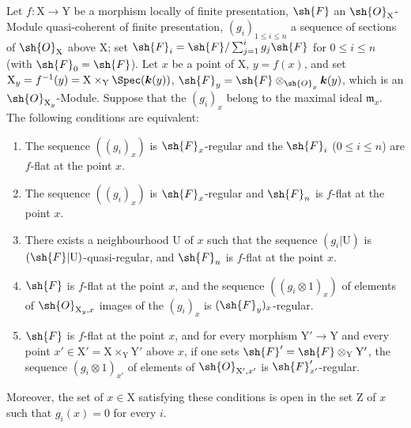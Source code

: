 \begin{theorem}[11.3.8]
\label{IV.11.3.8}
Let $f:\mathrm{X}\to\mathrm{Y}$ be a morphism locally of finite presentation, $\sh{F}$ an $\sh{O}_\mathrm{X}$-Module quasi-coherent of finite presentation, $(g_i)_{1\leqslant i\leqslant n}$ a sequence of sections of $\sh{O}_\mathrm{X}$ above $\mathrm{X}$; set $\sh{F}_i=\sh{F}/\sum_{j=1}^{i}g_j\sh{F}$ for $0\leqslant i\leqslant n$ (with $\sh{F}_0=\sh{F}$). Let $x$ be a point of $\mathrm{X}$, $y=f(x)$, and set $\mathrm{X}_y=f^{-1}(y)=\mathrm{X}\times_\mathrm{Y}\Spec(\boldsymbol{k}(y))$, $\sh{F}_y=\sh{F}\otimes_{\sh{O}_y}\boldsymbol{k}(y)$, which is an $\sh{O}_{\mathrm{X}_y}$-Module. Suppose that the $(g_i)_x$ belong to the maximal ideal $\mathfrak{m}_x$. The following conditions are equivalent:
\begin{enumerate}[label=\emph{\alph*)}]
  \item The sequence $((g_i)_x)$ is $\sh{F}_x$-regular and the $\sh{F}_i$ ($0\leqslant i\leqslant n$) are $f$-flat at the point $x$.
  \item The sequence $((g_i)_x)$ is $\sh{F}_x$-regular and $\sh{F}_n$ is $f$-flat at the point $x$.
  \item[\emph{b$'$)}] There exists a neighbourhood $\mathrm{U}$ of $x$ such that the sequence $(g_i|\mathrm{U})$ is $(\sh{F}|\mathrm{U})$-quasi-regular, and $\sh{F}_n$ is $f$-flat at the point $x$.
  \item $\sh{F}$ is $f$-flat at the point $x$, and the sequence $((g_i\otimes 1)_x)$ of elements of $\sh{O}_{\mathrm{X}_y,x}$ images of the $(g_i)_x$ is $(\sh{F}_y)_x$-regular.
  \item $\sh{F}$ is $f$-flat at the point $x$, and for every morphism $\mathrm{Y}'\to\mathrm{Y}$ and every point $x'\in\mathrm{X}'=\mathrm{X}\times_\mathrm{Y}\mathrm{Y}'$ above $x$, if one sets $\sh{F}'=\sh{F}\otimes_\mathrm{Y}\mathrm{Y}'$, the sequence $(g_i\otimes 1)_{x'}$ of elements of $\sh{O}_{\mathrm{X}',x'}$ is $\sh{F}'_{x'}$-regular.
\end{enumerate}
Moreover, the set of $x\in\mathrm{X}$ satisfying these conditions is open in the set $\mathrm{Z}$ of $x$ such that $g_i(x)=0$ for every $i$.
\end{theorem}

